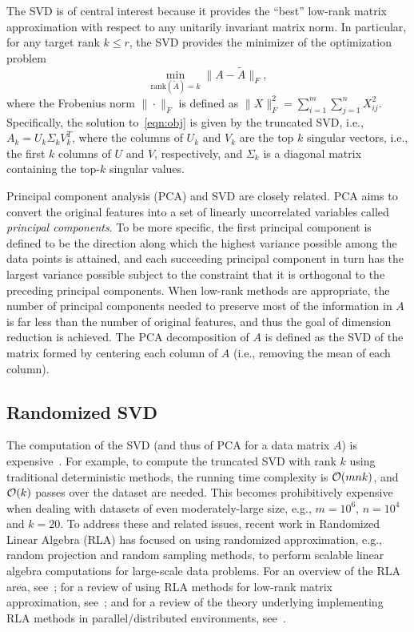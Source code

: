  
The SVD is of central interest because it provides the ``best'' low-rank matrix approximation with respect to any unitarily invariant matrix norm.
In particular, for any target rank $k \leq r$, the SVD provides the minimizer of the optimization problem
\begin{equation}
 \label{eqn:obj}
  \min_{\text{rank}(\tilde A) = k} \| A - \tilde A \|_F,
\end{equation}
where the Frobenius norm $\| \cdot \|_F$ is defined as $\|X\|_F^2 =
\sum_{i=1}^m \sum_{j=1}^n X_{ij}^2 $. Specifically, the solution
to~\eqref{eqn:obj} is given by the truncated SVD, i.e., $A_k = U_k \Sigma_k
V_k^T$, where the columns of $U_k$ and $V_k$ are the top $k$ singular vectors,
i.e., the first $k$ columns of $U$ and $V$, respectively, and $\Sigma_k$ is a 
diagonal matrix containing the top-$k$ singular values.

Principal component analysis (PCA) and SVD are closely related.
PCA aims to convert the original features into a set of linearly uncorrelated variables called {\it principal components}.
To be more specific, the first principal component is defined to be the direction along which the highest variance possible among the data points is attained, and each succeeding principal component in turn has the largest variance possible subject to the constraint that it is orthogonal to the preceding principal components.
When low-rank methods are appropriate, the number of principal components needed to preserve most of the information in $A$ is far less than the number of original features, and thus the goal of dimension reduction is achieved.
The PCA decomposition of $A$ is defined as the SVD of the matrix formed by centering each column of $A$ (i.e., removing the mean of each column).

\subsection{Randomized SVD}

The computation of the SVD (and thus of PCA for a data matrix $A$) is
expensive~\cite{GVL96}.  For example, to compute the truncated SVD with rank
$k$ using traditional deterministic methods, the running time complexity is
$\operatorname{\mathcal{O}}(mnk)$, and $\operatorname{\mathcal{O}}(k)$ passes over the dataset are needed.  This  becomes
prohibitively expensive when dealing with datasets of even moderately-large
size, e.g., $m = 10^6$, $n = 10^4$ and $k = 20$.  To address these and related
issues, recent work in Randomized Linear Algebra (RLA) has focused on using
randomized approximation, e.g., random projection and random sampling methods,
to perform scalable linear algebra computations for
large-scale data problems.  For an overview of the RLA area,
see~\cite{Mah-mat-rev_BOOK}; for a review of using RLA methods for low-rank
matrix approximation, see~\cite{HMT09_SIREV}; and for a review of the theory
underlying implementing RLA methods in parallel/distributed environments,
see~\cite{YMM15_TR}.

